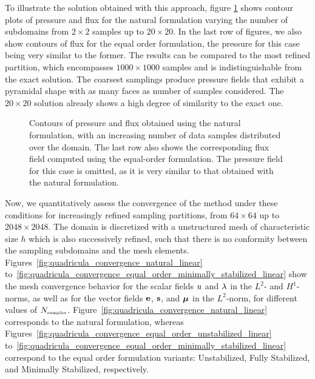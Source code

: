 To illustrate the solution obtained with this approach, figure \ref{fig:compound_Nsamples} shows
contour plots of pressure and flux for the natural formulation 
varying the number of subdomains from $2\times 2$ samples up to $20 \times 20$. 
In the last row of figures, we also show contours of flux for the equal order
formulation, the pressure for this case being very similar to the former. 
The results can be compared to the most refined partition, which encompasses $1000 \times 1000$
samples and is indistinguishable from the exact solution. 
The coarsest samplings produce pressure fields that exhibit a pyramidal shape with
as many faces as number of samples considered. The $20 \times 20$ solution 
already shows a high degree of similarity to the exact one.
\begin{figure}[h!]
	\centering
	\caption{Contours of pressure and flux obtained using the natural formulation, with an increasing number of data samples distributed over the domain. The last row also shows the corresponding flux field computed using the equal-order formulation. The pressure field for this case is omitted, as it is very
	similar to that obtained with the natural formulation.}
	\fontsize{8pt}{10pt}\selectfont 
	\def\svgwidth{1.0\columnwidth}
	
	\label{fig:compound_Nsamples}
\end{figure}

Now, we quantitatively assess the convergence of the method under these conditions for
increasingly refined sampling partitions, from $64 \times 64$ up to $2048 \times 2048$.
The domain is discretized with a unstructured mesh of characteristic size $h$ which
is also successively refined, such that there is no conformity between the sampling
subdomains and the mesh elements. Figures~\ref{fig:quadricula_convergence_natural_linear} to~\ref{fig:quadricula_convergence_equal_order_minimally_stabilized_linear} show the mesh convergence behavior for the scalar fields $u$ and $\lambda$ in the $L^{2}$- and $H^{1}$-norms, as well as for the vector fields $\mathbf{e}$, $\mathbf{s}$, and $\boldsymbol{\mu}$ in the $L^{2}$-norm, for different values of $N_{\mbox{\tiny samples}}$. Figure~\ref{fig:quadricula_convergence_natural_linear} corresponds to the natural formulation, whereas Figures~\ref{fig:quadricula_convergence_equal_order_unstabilized_linear} to~\ref{fig:quadricula_convergence_equal_order_minimally_stabilized_linear} correspond to the equal order formulation variants: Unstabilized, Fully Stabilized, and Minimally Stabilized, respectively.

